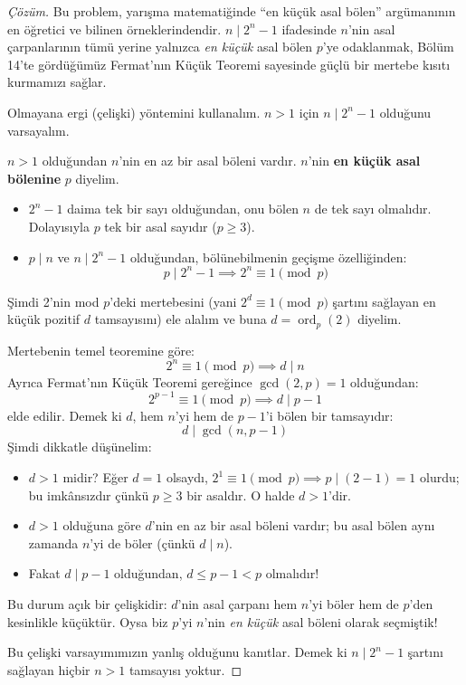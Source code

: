\begin{proof}[Çözüm]
Bu problem, yarışma matematiğinde ``en küçük asal bölen'' argümanının en öğretici ve bilinen örneklerindendir. $n \mid 2^n - 1$ ifadesinde $n$'nin asal çarpanlarının tümü yerine yalnızca \emph{en küçük} asal bölen $p$'ye odaklanmak, Bölüm 14'te gördüğümüz Fermat'nın Küçük Teoremi sayesinde güçlü bir mertebe kısıtı kurmamızı sağlar.

Olmayana ergi (çelişki) yöntemini kullanalım. $n > 1$ için $n \mid 2^n - 1$ olduğunu varsayalım.

$n > 1$ olduğundan $n$'nin en az bir asal böleni vardır. $n$'nin \textbf{en küçük asal bölenine} $p$ diyelim.
\begin{itemize}
    \item $2^n - 1$ daima tek bir sayı olduğundan, onu bölen $n$ de tek sayı olmalıdır. Dolayısıyla $p$ tek bir asal sayıdır ($p \ge 3$).
    \item $p \mid n$ ve $n \mid 2^n - 1$ olduğundan, bölünebilmenin geçişme özelliğinden:
    \[
    p \mid 2^n - 1 \implies 2^n \equiv 1 \pmod p
    \]
\end{itemize}
Şimdi 2'nin mod $p$'deki mertebesini (yani $2^d \equiv 1 \pmod p$ şartını sağlayan en küçük pozitif $d$ tamsayısını) ele alalım ve buna $d = \operatorname{ord}_p(2)$ diyelim.

Mertebenin temel teoremine göre:
\[
2^n \equiv 1 \pmod p \implies d \mid n
\]
Ayrıca Fermat'nın Küçük Teoremi gereğince $\gcd(2, p) = 1$ olduğundan:
\[
2^{p-1} \equiv 1 \pmod p \implies d \mid p - 1
\]
elde edilir. Demek ki $d$, hem $n$'yi hem de $p - 1$'i bölen bir tamsayıdır:
\[
d \mid \gcd(n, p - 1)
\]
Şimdi dikkatle düşünelim:
\begin{itemize}
    \item $d > 1$ midir? Eğer $d = 1$ olsaydı, $2^1 \equiv 1 \pmod p \implies p \mid (2 - 1) = 1$ olurdu; bu imkânsızdır çünkü $p \ge 3$ bir asaldır. O halde $d > 1$'dir.
    \item $d > 1$ olduğuna göre $d$'nin en az bir asal böleni vardır; bu asal bölen aynı zamanda $n$'yi de böler (çünkü $d \mid n$).
    \item Fakat $d \mid p - 1$ olduğundan, $d \le p - 1 < p$ olmalıdır!
\end{itemize}
Bu durum açık bir çelişkidir: $d$'nin asal çarpanı hem $n$'yi böler hem de $p$'den kesinlikle küçüktür. Oysa biz $p$'yi $n$'nin \emph{en küçük} asal böleni olarak seçmiştik!

Bu çelişki varsayımımızın yanlış olduğunu kanıtlar. Demek ki $n \mid 2^n - 1$ şartını sağlayan hiçbir $n > 1$ tamsayısı yoktur.
\end{proof}

